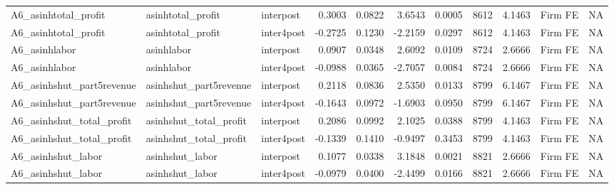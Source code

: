 \begin{table}
\begin{tabular}[t]{lllrrrrrrll}
A6\_asinhtotal\_profit & asinhtotal\_profit & interpost & 0.3003 & 0.0822 & 3.6543 & 0.0005 & 8612 & 4.1463 & Firm FE & NA\\
\addlinespace
A6\_asinhtotal\_profit & asinhtotal\_profit & inter4post & -0.2725 & 0.1230 & -2.2159 & 0.0297 & 8612 & 4.1463 & Firm FE & NA\\
A6\_asinhlabor & asinhlabor & interpost & 0.0907 & 0.0348 & 2.6092 & 0.0109 & 8724 & 2.6666 & Firm FE & NA\\
A6\_asinhlabor & asinhlabor & inter4post & -0.0988 & 0.0365 & -2.7057 & 0.0084 & 8724 & 2.6666 & Firm FE & NA\\
A6\_asinhshut\_part5revenue & asinhshut\_part5revenue & interpost & 0.2118 & 0.0836 & 2.5350 & 0.0133 & 8799 & 6.1467 & Firm FE & NA\\
A6\_asinhshut\_part5revenue & asinhshut\_part5revenue & inter4post & -0.1643 & 0.0972 & -1.6903 & 0.0950 & 8799 & 6.1467 & Firm FE & NA\\
\addlinespace
A6\_asinhshut\_total\_profit & asinhshut\_total\_profit & interpost & 0.2086 & 0.0992 & 2.1025 & 0.0388 & 8799 & 4.1463 & Firm FE & NA\\
A6\_asinhshut\_total\_profit & asinhshut\_total\_profit & inter4post & -0.1339 & 0.1410 & -0.9497 & 0.3453 & 8799 & 4.1463 & Firm FE & NA\\
A6\_asinhshut\_labor & asinhshut\_labor & interpost & 0.1077 & 0.0338 & 3.1848 & 0.0021 & 8821 & 2.6666 & Firm FE & NA\\
A6\_asinhshut\_labor & asinhshut\_labor & inter4post & -0.0979 & 0.0400 & -2.4499 & 0.0166 & 8821 & 2.6666 & Firm FE & NA\\
\bottomrule
\end{tabular}
\end{table}
